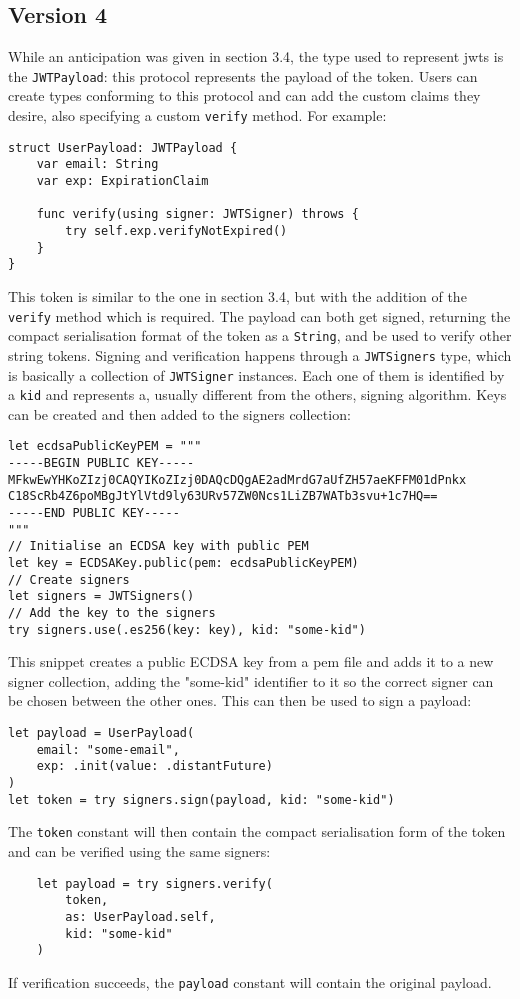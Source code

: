 \subsection{Version 4}
While an anticipation was given in section 3.4, the type used to represent \gls{jwt}s is the \lstinline{JWTPayload}: this protocol represents the payload of the token. Users can create types conforming to this protocol and can add the custom claims they desire, also specifying a custom \lstinline{verify} method. For example:
\begin{verbatim}
struct UserPayload: JWTPayload {
    var email: String
    var exp: ExpirationClaim

    func verify(using signer: JWTSigner) throws {
        try self.exp.verifyNotExpired()
    }
}
\end{verbatim}
This token is similar to the one in section 3.4, but with the addition of the \lstinline{verify} method which is required.
The payload can both get signed, returning the compact serialisation format of the token as a \lstinline{String}, and be used to verify other string tokens. Signing and verification happens through a \lstinline{JWTSigners} type, which is basically a collection of \lstinline{JWTSigner} instances. Each one of them is identified by a \lstinline{kid} and represents a, usually different from the others, signing algorithm.
Keys can be created and then added to the signers collection:
\begin{verbatim}
let ecdsaPublicKeyPEM = """
-----BEGIN PUBLIC KEY-----
MFkwEwYHKoZIzj0CAQYIKoZIzj0DAQcDQgAE2adMrdG7aUfZH57aeKFFM01dPnkx
C18ScRb4Z6poMBgJtYlVtd9ly63URv57ZW0Ncs1LiZB7WATb3svu+1c7HQ==
-----END PUBLIC KEY-----
"""
// Initialise an ECDSA key with public PEM
let key = ECDSAKey.public(pem: ecdsaPublicKeyPEM)
// Create signers
let signers = JWTSigners()
// Add the key to the signers
try signers.use(.es256(key: key), kid: "some-kid")
\end{verbatim}
This snippet creates a public ECDSA key from a \gls{pem} file and adds it to a new signer collection, adding the "some-kid" identifier to it so the correct signer can be chosen between the other ones. This can then be used to sign a payload:
\begin{verbatim}
let payload = UserPayload(
    email: "some-email", 
    exp: .init(value: .distantFuture)
)
let token = try signers.sign(payload, kid: "some-kid")
\end{verbatim}
The \lstinline{token} constant will then contain the compact serialisation form of the token and can be verified using the same signers:
\begin{verbatim}
    let payload = try signers.verify(
        token, 
        as: UserPayload.self, 
        kid: "some-kid"
    )
\end{verbatim}
If verification succeeds, the \lstinline{payload} constant will contain the original payload.\cite{jwtkit-4}

